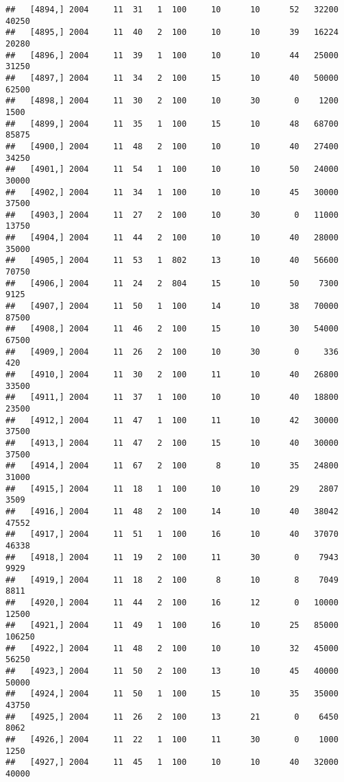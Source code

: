 \documentclass{article}\usepackage[]{graphicx}\usepackage[]{color}
\makeatletter
\newenvironment{kframe}{%
 \def\at@end@of@kframe{}%
 \ifinner\ifhmode%
  \def\at@end@of@kframe{\end{minipage}}%
  \begin{minipage}{\columnwidth}%
 \fi\fi%
 \def\FrameCommand##1{\hskip\@totalleftmargin \hskip-\fboxsep
 \colorbox{shadecolor}{##1}\hskip-\fboxsep
     \hskip-\linewidth \hskip-\@totalleftmargin \hskip\columnwidth}%
 \MakeFramed {\advance\hsize-\width
   \@totalleftmargin\z@ \linewidth\hsize
   \@setminipage}}%
 {\par\unskip\endMakeFramed%
 \at@end@of@kframe}
\newenvironment{knitrout}{}{} %
\makeatother
\begin{document}
\begin{knitrout}
\begin{kframe}
\begin{verbatim}
##   [4894,] 2004     11  31   1  100     10      10      52   32200   40250
##   [4895,] 2004     11  40   2  100     10      10      39   16224   20280
##   [4896,] 2004     11  39   1  100     10      10      44   25000   31250
##   [4897,] 2004     11  34   2  100     15      10      40   50000   62500
##   [4898,] 2004     11  30   2  100     10      30       0    1200    1500
##   [4899,] 2004     11  35   1  100     15      10      48   68700   85875
##   [4900,] 2004     11  48   2  100     10      10      40   27400   34250
##   [4901,] 2004     11  54   1  100     10      10      50   24000   30000
##   [4902,] 2004     11  34   1  100     10      10      45   30000   37500
##   [4903,] 2004     11  27   2  100     10      30       0   11000   13750
##   [4904,] 2004     11  44   2  100     10      10      40   28000   35000
##   [4905,] 2004     11  53   1  802     13      10      40   56600   70750
##   [4906,] 2004     11  24   2  804     15      10      50    7300    9125
##   [4907,] 2004     11  50   1  100     14      10      38   70000   87500
##   [4908,] 2004     11  46   2  100     15      10      30   54000   67500
##   [4909,] 2004     11  26   2  100     10      30       0     336     420
##   [4910,] 2004     11  30   2  100     11      10      40   26800   33500
##   [4911,] 2004     11  37   1  100     10      10      40   18800   23500
##   [4912,] 2004     11  47   1  100     11      10      42   30000   37500
##   [4913,] 2004     11  47   2  100     15      10      40   30000   37500
##   [4914,] 2004     11  67   2  100      8      10      35   24800   31000
##   [4915,] 2004     11  18   1  100     10      10      29    2807    3509
##   [4916,] 2004     11  48   2  100     14      10      40   38042   47552
##   [4917,] 2004     11  51   1  100     16      10      40   37070   46338
##   [4918,] 2004     11  19   2  100     11      30       0    7943    9929
##   [4919,] 2004     11  18   2  100      8      10       8    7049    8811
##   [4920,] 2004     11  44   2  100     16      12       0   10000   12500
##   [4921,] 2004     11  49   1  100     16      10      25   85000  106250
##   [4922,] 2004     11  48   2  100     10      10      32   45000   56250
##   [4923,] 2004     11  50   2  100     13      10      45   40000   50000
##   [4924,] 2004     11  50   1  100     15      10      35   35000   43750
##   [4925,] 2004     11  26   2  100     13      21       0    6450    8062
##   [4926,] 2004     11  22   1  100     11      30       0    1000    1250
##   [4927,] 2004     11  45   1  100     10      10      40   32000   40000

\end{verbatim}
\end{kframe}
\end{knitrout}
\end{document}
